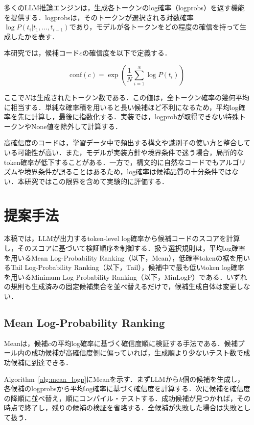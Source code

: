 \documentclass[submit,techrep,noauthor]{ipsj}
\begin{document}
多くのLLM推論エンジンは，生成各トークンのlog確率（logprobs）を返す機能を提供する．logprobsは，そのトークンが選択される対数確率$\log P(t_i|t_1,\ldots,t_{i-1})$であり，モデルが各トークンをどの程度の確信を持って生成したかを表す．

本研究では，候補コード$c$の確信度を以下で定義する．

\begin{equation}
\text{conf}(c) = \exp\left(\frac{1}{N} \sum_{i=1}^{N} \log P(t_i)\right)
\end{equation}

ここで$N$は生成されたトークン数である．この値は，全トークン確率の幾何平均に相当する．単純な確率積を用いると長い候補ほど不利になるため，平均log確率を先に計算し，最後に指数化する．実装では，logprobが取得できない特殊トークンやNone値を除外して計算する．

高確信度のコードは，学習データ中で頻出する構文や識別子の使い方と整合している可能性が高い．また，モデルが実装方針や境界条件で迷う場合，局所的なtoken確率が低下することがある．一方で，構文的に自然なコードでもアルゴリズムや境界条件が誤ることはあるため，log確率は候補品質の十分条件ではない．本研究ではこの限界を含めて実験的に評価する．

\section{提案手法}


本稿では，LLMが出力するtoken-level log確率から候補コードのスコアを計算し，そのスコアに基づいて検証順序を制御する．扱う選択規則は，平均log確率を用いるMean Log-Probability Ranking（以下，Mean），低確率tokenの裾を用いるTail Log-Probability Ranking（以下，Tail），候補中で最も低いtoken log確率を用いるMinimum Log-Probability Ranking（以下，MinLogP）である．いずれの規則も生成済みの固定候補集合を並べ替えるだけで，候補生成自体は変更しない．

\subsection{Mean Log-Probability Ranking}

Meanは，候補$c$の平均log確率に基づく確信度順に検証する手法である．候補プール内の成功候補が高確信度側に偏っていれば，生成順より少ないテスト数で成功候補に到達できる．

Algorithm~\ref{alg:mean_logp}にMeanを示す．まずLLMから$k$個の候補を生成し，各候補のlogprobsから平均log確率に基づく確信度を計算する．次に候補を確信度の降順に並べ替え，順にコンパイル・テストする．成功候補が見つかれば，その時点で終了し，残りの候補の検証を省略する．全候補が失敗した場合は失敗として扱う．
\end{document}
